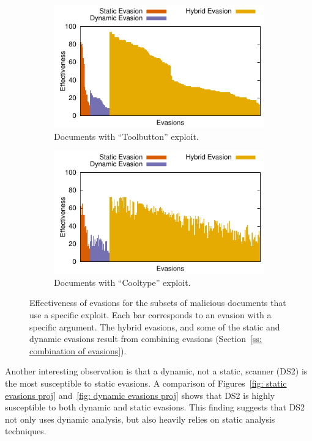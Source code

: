 \begin{figure}[tb]
\begin{minipage}{0.4\linewidth}
\begin{subfigure}[b]{\textwidth}
			\hspace*{-.6em}\includegraphics{figures/toolbutton-projection}
			\caption{Documents with ``Toolbutton'' exploit.}
			\label{figure:toolbutton projection}
		\end{subfigure}
		\vspace{2em}
		
		\begin{subfigure}[b]{\textwidth}
			\hspace*{-.6em}\includegraphics{figures/cooltype-projection}
			\caption{Documents with ``Cooltype'' exploit.}
			\label{figure:cooltype projection}
		\end{subfigure}
		\caption{Effectiveness of evasions for the subsets of malicious documents that use a specific exploit. Each bar corresponds to an evasion with a specific argument. The hybrid evasions, and some of the static and dynamic evasions  result from combining evasions (Section~\ref{ss: combination of evasions}).}
	\end{minipage}
\end{figure}


Another interesting observation is that a dynamic, not a static, scanner (DS2) is the most susceptible to static evasions.
A comparison of  Figures~\ref{fig: static evasions proj} and~\ref{fig: dynamic evasions proj} shows that DS2 is highly susceptible to both dynamic and static evasions.
This finding suggests that DS2 not only uses dynamic analysis, but also 
heavily relies on static analysis techniques.

